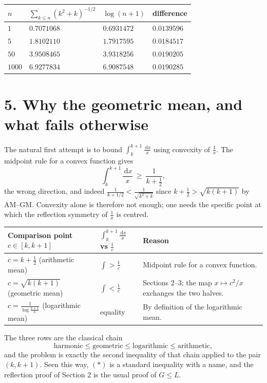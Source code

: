 \documentclass[12pt]{article}
\newcommand{\dd}{\,\mathrm{d}}
\begin{document}
\begin{center}
\small
\renewcommand{\arraystretch}{1.35}
\begin{tabularx}{0.9\textwidth}{@{}lXXX@{}}
\toprule
\(n\) & \(\sum_{k\le n}(k^2+k)^{-1/2}\) & \(\log(n+1)\) & difference \\
\midrule
\(1\)    & \(0.7071068\) & \(0.6931472\) & \(0.0139596\) \\
\(5\)    & \(1.8102110\) & \(1.7917595\) & \(0.0184517\) \\
\(50\)   & \(3.9508465\) & \(3.9318256\) & \(0.0190205\) \\
\(1000\) & \(6.9277834\) & \(6.9087548\) & \(0.0190285\) \\
\bottomrule
\end{tabularx}
\end{center}

\section*{5. Why the geometric mean, and what fails otherwise}

The natural first attempt is to bound \(\int_k^{k+1}\frac{\dd x}{x}\)
using convexity of \(\frac1x\). The midpoint rule for a convex function
gives
\[
\int_k^{k+1}\frac{\dd x}{x}\ \ge\ \frac1{k+\frac12},
\]
the wrong direction, and indeed \(\frac1{k+1/2}<\frac1{\sqrt{k^2+k}}\)
since \(k+\frac12>\sqrt{k(k+1)}\) by AM--GM. Convexity alone is therefore
not enough; one needs the specific point at which the reflection symmetry
of \(\frac1x\) is centred.

\begin{center}
\small
\renewcommand{\arraystretch}{1.45}
\begin{tabularx}{\textwidth}{@{}>{\raggedright\arraybackslash}p{}>{\raggedright\arraybackslash}p{}X@{}}
\toprule
Comparison point \(c\in[k,k+1]\) & \(\displaystyle\int_k^{k+1}\frac{\dd x}{x}\) vs \(\frac1c\) & Reason \\
\midrule
\(c=k+\frac12\) (arithmetic mean)
& \(\displaystyle\int>\frac1c\)
& Midpoint rule for a convex function. \\
\addlinespace
\(c=\sqrt{k(k+1)}\) (geometric mean)
& \(\displaystyle\int<\frac1c\)
& Sections 2--3; the map \(x\mapsto c^2/x\) exchanges the two halves. \\
\addlinespace
\(c=\frac{1}{\log\frac{k+1}{k}}\) (logarithmic mean)
& equality
& By definition of the logarithmic mean. \\
\bottomrule
\end{tabularx}
\end{center}

The three rows are the classical chain
\[
\text{harmonic}\le\text{geometric}\le\text{logarithmic}\le\text{arithmetic},
\]
and the problem is exactly the second inequality of that chain applied to
the pair \((k,k+1)\). Seen this way, \((\ast)\) is a standard inequality with a name, and the
reflection proof of Section 2 is the usual proof of \(G\le L\).
\end{document}
